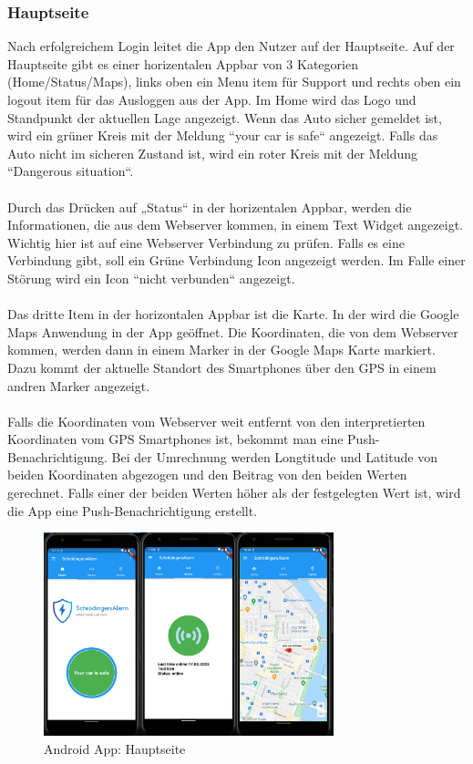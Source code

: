 \subsubsection{Hauptseite}
Nach erfolgreichem Login leitet die App den Nutzer auf der Hauptseite.
Auf der Hauptseite gibt es einer horizentalen Appbar von 3 Kategorien (Home/Status/Maps), links oben ein Menu item für Support und rechts oben ein logout item für das Ausloggen aus der App. 
Im Home wird das Logo und Standpunkt der aktuellen Lage angezeigt.
Wenn das Auto sicher gemeldet ist, wird ein grüner Kreis mit der Meldung “your car is safe“ angezeigt. 
Falls das Auto nicht im sicheren Zustand ist, wird ein roter Kreis mit der Meldung “Dangerous situation“.\\\\
Durch das Drücken auf „Status“ in der horizentalen Appbar, werden die Informationen, die aus dem Webserver kommen, in einem Text Widget angezeigt.
Wichtig hier ist auf eine Webserver Verbindung zu prüfen. Falls es eine Verbindung gibt, soll ein Grüne Verbindung Icon angezeigt werden.
Im Falle einer Störung wird ein Icon “nicht verbunden“ angezeigt.\\\\
Das dritte Item in der horizontalen Appbar ist die Karte. In der wird die Google Maps Anwendung in der App geöffnet.
Die Koordinaten, die von dem Webserver kommen, werden dann in einem Marker in der Google Maps Karte markiert. 
Dazu kommt der aktuelle Standort des Smartphones über den GPS in einem andren Marker angezeigt.\\\\
Falls die Koordinaten vom Webserver weit entfernt von den interpretierten Koordinaten vom GPS Smartphones ist, bekommt man eine Push-Benachrichtigung. Bei der Umrechnung werden Longtitude und Latitude von beiden Koordinaten abgezogen und den Beitrag von den beiden Werten gerechnet. 
Falls einer der beiden Werten höher als der festgelegten Wert ist, wird die App eine Push-Benachrichtigung erstellt.
 	\begin{figure}[H]
   \centering
            \includegraphics[width=0.75\textwidth]{Bilder/hauptseite.PNG}
		            \caption{Android App: Hauptseite}
    \end{figure}
